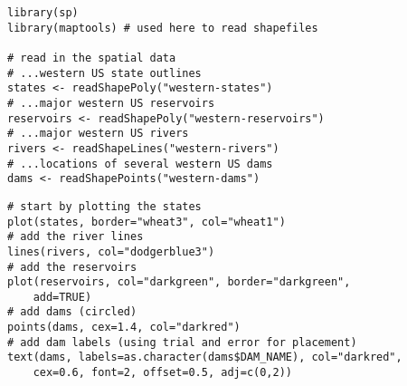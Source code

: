 \documentclass{beamer}
\begin{document}

\begin{frame}[fragile]
\begin{framed}
\begin{verbatim}
library(sp)
library(maptools) # used here to read shapefiles
 
# read in the spatial data
# ...western US state outlines
states <- readShapePoly("western-states")
# ...major western US reservoirs
reservoirs <- readShapePoly("western-reservoirs")
# ...major western US rivers
rivers <- readShapeLines("western-rivers")
# ...locations of several western US dams
dams <- readShapePoints("western-dams")
\end{verbatim}
\end{framed}
\end{frame}

\begin{frame}[fragile]
\begin{framed}
\begin{verbatim} 
# start by plotting the states
plot(states, border="wheat3", col="wheat1")
# add the river lines
lines(rivers, col="dodgerblue3")
# add the reservoirs
plot(reservoirs, col="darkgreen", border="darkgreen",
    add=TRUE)
# add dams (circled)
points(dams, cex=1.4, col="darkred")
# add dam labels (using trial and error for placement)
text(dams, labels=as.character(dams$DAM_NAME), col="darkred",
    cex=0.6, font=2, offset=0.5, adj=c(0,2))
\end{verbatim}
\end{framed}
\end{frame}
\end{document}

